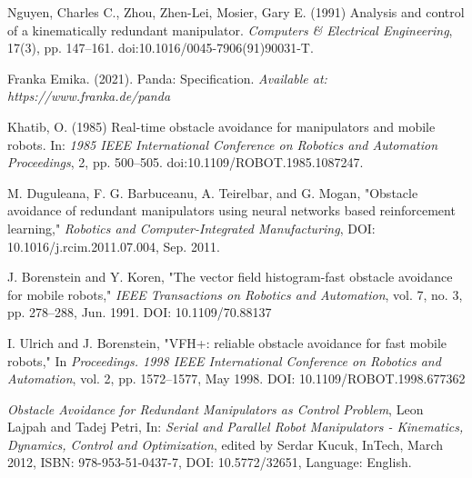 \documentclass[a4paper]{article}
\begin{document}
\small
\begin{thebibliography}{1}
	
	
 Nguyen, Charles C., Zhou, Zhen-Lei, Mosier, Gary E. (1991) Analysis and control of a kinematically redundant manipulator. \textit{Computers \& Electrical Engineering}, 17(3), pp. 147–161. doi:10.1016/0045-7906(91)90031-T.

 Franka Emika. (2021). Panda: Specification. \textit{Available at: https://www.franka.de/panda}

 Khatib, O. (1985) Real-time obstacle avoidance for manipulators and mobile robots. In: \textit{1985 IEEE International Conference on Robotics and Automation Proceedings}, 2, pp. 500–505. doi:10.1109/ROBOT.1985.1087247.

M. Duguleana, F. G. Barbuceanu, A. Teirelbar, and G. Mogan,
"Obstacle avoidance of redundant manipulators using neural networks based reinforcement learning,"
\textit{Robotics and Computer-Integrated Manufacturing}, 
DOI: 10.1016/j.rcim.2011.07.004, Sep. 2011.

J. Borenstein and Y. Koren,
"The vector field histogram-fast obstacle avoidance for mobile robots,"
\textit{IEEE Transactions on Robotics and Automation}, 
vol. 7, no. 3, pp. 278–288, Jun. 1991.
DOI: 10.1109/70.88137

I. Ulrich and J. Borenstein,
"VFH+: reliable obstacle avoidance for fast mobile robots,"
In \textit{Proceedings. 1998 IEEE International Conference on Robotics and Automation}, 
vol. 2, pp. 1572–1577, May 1998.
DOI: 10.1109/ROBOT.1998.677362

\textit{Obstacle Avoidance for Redundant Manipulators as Control Problem},
Leon Lajpah and Tadej Petri,
In: \textit{Serial and Parallel Robot Manipulators - Kinematics, Dynamics, Control and Optimization},
edited by Serdar Kucuk,
InTech, March 2012,
ISBN: 978-953-51-0437-7,
DOI: 10.5772/32651,
Language: English.






\end{thebibliography}
\end{document}
